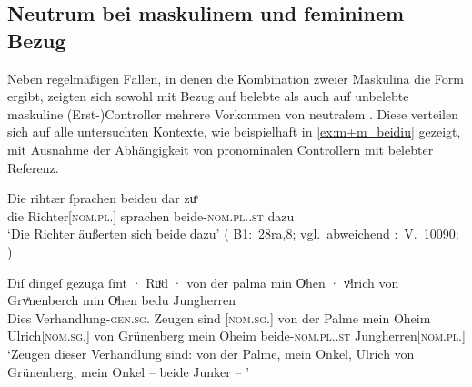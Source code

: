 \subsection{Neutrum bei maskulinem und femininem Bezug}
\label{subsec:m+m_anim_beidiu}

Neben regelmäßigen Fällen, in denen die Kombination zweier Maskulina die Form
 ergibt, zeigten sich sowohl mit Bezug auf belebte als auch auf
unbelebte maskuline (Erst-)Controller mehrere Vorkommen von neutralem
. Diese verteilen sich auf alle untersuchten Kontexte, wie
beispielhaft in \cref{ex:m+m_beidiu} gezeigt, mit Ausnahme der Abhängigkeit von
pronominalen Controllern mit belebter Referenz.

\begin{exe}
\ex \label{ex:m+m_beidiu}
	\begin{xlist}
	\ex \label{ex:m+m_beidiu_1}
		\gll Die rihtær ſprachen beideu {dar zuͦ} \\
			die Richter[\textsc{nom.pl.\MascM}] sprachen
			beide-\textsc{nom.pl.\NeutM.st} dazu \\
		\trans `Die Richter äußerten sich beide dazu'
			(%
				B1:~28ra,8; vgl.~abweichend
				\KC:~V.~10090;
				\cite[267]{schroeder1895}%
			)

	\ex \label{ex:m+m_beidiu_3}
		\gll Diſ dingeſ gezuga ſint · Ruͦd · von der palma min Oͤhen · vͦlrich
				von Grvͤnenberch min Oͤhen bedu Jungherren \textelp{} \\
			Dies Verhandlung-\textsc{gen.sg.\NeutI} Zeugen sind {}
				[\textsc{nom.sg.\MascM}] {} von der Palme mein Oheim
				{} Ulrich[\textsc{nom.sg.\MascM}] von Grünenberg mein Oheim
				beide-\textsc{nom.pl.\NeutM.st}
				Jungherren[\textsc{nom.pl.\MascM}] {} \\
		\trans `Zeugen dieser Verhandlung sind:  von der Palme,
			mein Onkel, Ulrich von Grünenberg, mein Onkel -- beide Junker --
			\textelp{}'
			\parencites(Nr.~2915, Kl.~St.~Urban, Kt.~Luzern, 1298)[213,33--35]{cao4}



\end{xlist}
\end{exe}
